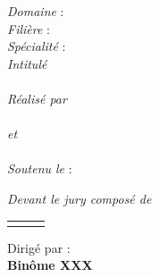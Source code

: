 {\begin{titlepage}
		{\large \textit{Domaine} : \bfseries {\@domaine}}\\
		{\large \textit{Filière} : \bfseries {\@filiere}}\\
		{\large \textit{Spécialité} : \bfseries{\@specialite}}\\
		\vspace{0.75cm}
		\textit{Intitulé}\\
		\vspace{0.25cm}
		{\Huge \color[RGB]{18,96,149} \bfseries{\@title}} \\
		\vfill
		\vspace{0.5cm}
		\textit{Réalisé par}\\
		\vspace{0.125cm}
		{\Large {\bfseries \@author}} \\
		\vspace{0.125cm}
		\textit{et}\\
		\vspace{0.125cm}
		{\Large {\bfseries \@helper}} \\
		\vspace{0.5cm}
		\textit{Soutenu le} : {\bfseries \@date} \\
		\vfill
		\vspace{0.25cm}
		
		\large \textit{Devant le jury composé de\\}
		\vspace{0.25cm}
		\begin{tabular}{>{\bfseries}llr}
			
			\@jurya
			\@juryb
		\end{tabular}
		\vfill
		\vspace{0.5cm}
		Dirigé par : {\bfseries \@directeur}\\
		\vfill
		\vspace{0.25cm}
		\textbf{Binôme \No XXX}
		
		
	\end{titlepage}
	\restoregeometry  
}
\makeatother